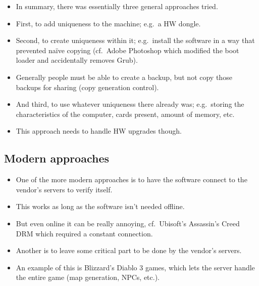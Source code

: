 \begin{frame}
  \begin{itemize}
    \item In summary, there was essentially three general approaches tried.

    \item First, to add uniqueness to the machine; e.g.\ a HW dongle.

    \item Second, to create uniqueness within it; e.g.\ install the software in 
      a way that prevented naïve copying (cf.\ Adobe Photoshop which modified 
      the boot loader and accidentally removes Grub).

    \item Generally people must be able to create a backup, but not copy those 
      backups for sharing (copy generation control).

    \item And third, to use whatever uniqueness there already was; e.g.\ 
      storing the characteristics of the computer, cards present, amount of 
      memory, etc.

    \item This approach needs to handle HW upgrades though.
  \end{itemize}
\end{frame}

\subsection{Modern approaches}

\begin{frame}
  \begin{itemize}
    \item One of the more modern approaches is to have the software connect to 
      the vendor's servers to verify itself.

    \item This works as long as the software isn't needed offline.

    \item But even online it can be really annoying, cf.\ Ubisoft's Assassin's 
      Creed DRM which required a constant connection.

    \item Another is to leave some critical part to be done by the vendor's 
      servers.

    \item An example of this is Blizzard's Diablo 3 games, which lets the 
      server handle the entire game (map generation, NPCs, etc.).
  \end{itemize}
\end{frame}

